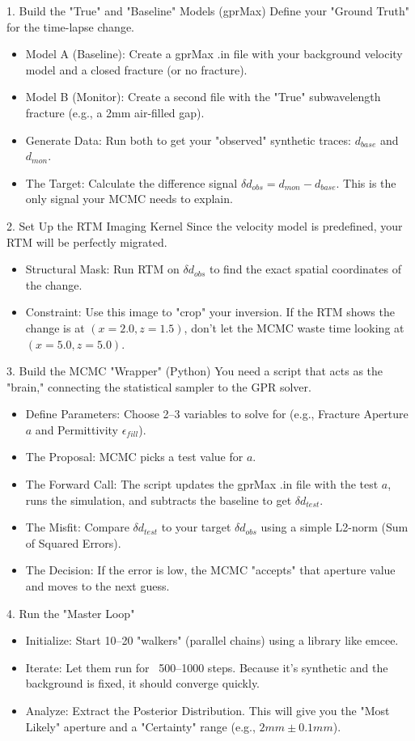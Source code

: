 1. Build the "True" and "Baseline" Models (gprMax)
Define your "Ground Truth" for the time-lapse change.
\begin{itemize}
    \item Model A (Baseline): Create a gprMax .in file with your background velocity model and a closed fracture (or no fracture).
    \item Model B (Monitor): Create a second file with the "True" subwavelength fracture (e.g., a 2mm air-filled gap).
    \item Generate Data: Run both to get your "observed" synthetic traces: $d_{base}$ and $d_{mon}$.
    \item The Target: Calculate the difference signal $\delta d_{obs} = d_{mon} - d_{base}$. This is the only signal your MCMC needs to explain.
\end{itemize}

2. Set Up the RTM Imaging Kernel
Since the velocity model is predefined, your RTM will be perfectly migrated.
\begin{itemize}
\item Structural Mask: Run RTM on $\delta d_{obs}$ to find the exact spatial coordinates of the change.
\item Constraint: Use this image to "crop" your inversion. If the RTM shows the change is at $(x=2.0, z=1.5)$, don't let the MCMC waste time looking at $(x=5.0, z=5.0)$.
\end{itemize}

3. Build the MCMC "Wrapper" (Python)
You need a script that acts as the "brain," connecting the statistical sampler to the GPR solver.
\begin{itemize}
\item Define Parameters: Choose 2–3 variables to solve for (e.g., Fracture Aperture $a$ and Permittivity $\epsilon_{fill}$).
\item The Proposal: MCMC picks a test value for $a$.
\item The Forward Call: The script updates the gprMax .in file with the test $a$, runs the simulation, and subtracts the baseline to get $\delta d_{test}$.
\item The Misfit: Compare $\delta d_{test}$ to your target $\delta d_{obs}$ using a simple L2-norm (Sum of Squared Errors).
\item The Decision: If the error is low, the MCMC "accepts" that aperture value and moves to the next guess.
\end{itemize}

4. Run the "Master Loop"
\begin{itemize}
\item Initialize: Start 10–20 "walkers" (parallel chains) using a library like emcee.
\item Iterate: Let them run for ~500–1000 steps. Because it's synthetic and the background is fixed, it should converge quickly.
\item Analyze: Extract the Posterior Distribution. This will give you the "Most Likely" aperture and a "Certainty" range (e.g., $2mm \pm 0.1mm$).
\end{itemize}

